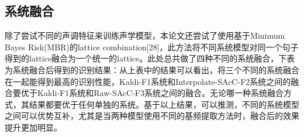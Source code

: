 \subsection{系统融合}
除了尝试不同的声调特征来训练声学模型，本论文还尝试了使用基于Minimum Bayes Risk(MBR)的lattice combination[28]，此方法将不同系统模型对同一个句子得到的lattice融合为一个统一的lattice。此处总共做了四种不同的系统融合，下表为系统融合后得到的识别结果：{\color{red}{补充期刊论文表5}}从上表中的结果可以看出，将三个不同的系统融合在一起能得到最高的识别性能，Kaldi-F1系统和Interpolate-SAcC-F2系统之间的融合要优于Kaldi-F1系统和Raw-SAcC-F3系统之间的融合。无论哪一种系统融合方式，其结果都要优于任何单独的系统。基于以上结果，可以推测，不同的系统模型之间可以优势互补，尤其是当两种模型使用不同的基频提取方法时，融合后的效果提升更加明显。
